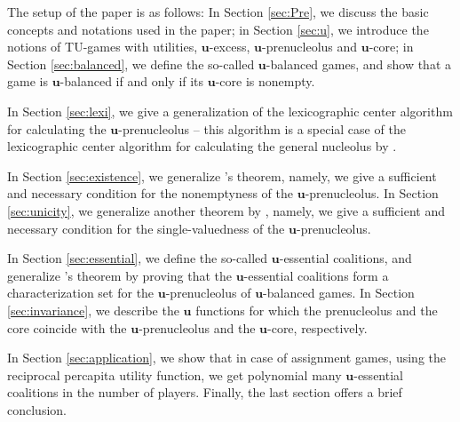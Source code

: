 \documentclass[a4paper,12pt]{article}
\theoremstyle{definition}
\theoremstyle{remark}
\begin{document}
The setup of the paper is as follows: In Section \ref{sec:Pre}, we discuss the basic concepts and notations used in the paper; in Section \ref{sec:u}, we introduce the notions of TU-games with utilities, $\mathbf{u}$-excess, $\mathbf{u}$-prenucleolus and $\mathbf{u}$-core; in Section \ref{sec:balanced}, we define the so-called $\mathbf{u}$-balanced games, and show that a game is $\mathbf{u}$-balanced if and only if its $\mathbf{u}$-core is nonempty. 

In Section \ref{sec:lexi}, we give a generalization of the lexicographic center algorithm for calculating the $\mathbf{u}$-prenucleolus -- this algorithm is a special case of the lexicographic center algorithm for calculating the general nucleolus by \cite{MaschlerPottersTijs1992}. 

In Section \ref{sec:existence}, we generalize \citet{Katsev2013}'s theorem, namely, we give a sufficient and necessary condition for the nonemptyness of the $\mathbf{u}$-prenucleolus. In Section \ref{sec:unicity}, we generalize another theorem by \citeauthor{Katsev2013}, namely, we give a sufficient and necessary condition for the single-valuedness of the $\mathbf{u}$-prenucleolus. 

In Section \ref{sec:essential}, we define the so-called $\mathbf{u}$-essential coalitions, and generalize \citet{Huberman1980}'s theorem by proving that the $\mathbf{u}$-essential coalitions form a characterization set for the $\mathbf{u}$-prenucleolus of $\mathbf{u}$-balanced games. In Section \ref{sec:invariance}, we describe the $\mathbf{u}$ functions for which the prenucleolus and the core coincide with the $\mathbf{u}$-prenucleolus and the $\mathbf{u}$-core, respectively. 

In Section \ref{sec:application}, we show that in case of assignment games, using the reciprocal percapita utility function, we get polynomial many $\mathbf{u}$-essential coalitions in the number of players. Finally, the last section offers a brief conclusion.




\end{document}
